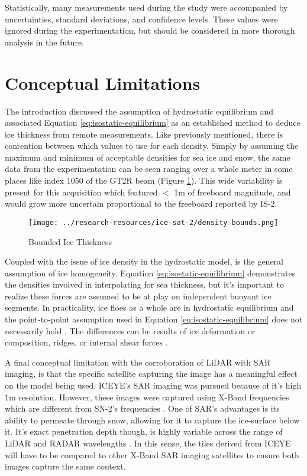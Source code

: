 Statistically, many measurements used during the study were accompanied by uncertainties, standard deviations, and confidence levels. These values were ignored during the experimentation, but should be considered in more thorough analysis in the future. 

\section{Conceptual Limitations}
The introduction discussed the assumption of hydrostatic equilibrium and associated Equation \ref{eq:isostatic-equilibrium} as an established method to deduce ice thickness from remote measurements. Like previously mentioned, there is contention between which values to use for each density. Simply by assuming the maximum and minimum of acceptable densities for sea ice and snow, the same data from the experimentation can be seen ranging over a whole meter in some places like index 1050 of the GT2R beam (Figure \ref{fig:density-bounds}). This wide variability is present for this acquisition which featured $<$ 1m of freeboard magnitude, and would grow more uncertain proportional to the freeboard reported by IS-2.

\begin{figure}[h]
	\centering
	\texttt{[image: ../research-resources/ice-sat-2/density-bounds.png]}
	\caption[Effect of Density Estimations on Ice Thickness Interpolation]{Bounded Ice Thickness}
	\label{fig:density-bounds}
\end{figure}

Coupled with the issue of ice density in the hydrostatic model, is the general assumption of ice homogeneity. Equation \ref{eq:isostatic-equilibrium} demonstrates the densities involved in interpolating for sea thickness, but it's important to realize these forces are assumed to be at play on independent buoyant ice segments. In practicality, ice floes as a whole are in hydrostatic equilibrium and the point-to-point assumption used in Equation \ref{eq:isostatic-equilibrium} does not necessarily hold \cite{Forsström_Gerland_Pedersen_2011}. The differences can be results of ice deformation or composition, ridges, or internal shear forces \cite{Hutchings_Heil_Lecomte_Stevens_Steer_Lieser_2015,sea-ice-properties}. 

A final conceptual limitation with the corroboration of LiDAR with SAR imaging, is that the specific satellite capturing the image has a meaningful effect on the model being used. ICEYE's SAR imaging was pursued because of it's high 1m resolution. However, these images were captured using X-Band frequencies which are different from SN-2's frequencies \cite{iceye-products,Sentinel-2-Availability}. One of SAR's advantages is its ability to permeate through snow, allowing for it to capture the ice-surface below it. It's exact penetration depth though, is highly variable across the range of LiDAR and RADAR wavelengths \cite{remotesensingkinematics}. In this sense, the tiles derived from ICEYE will have to be compared to other X-Band SAR imaging satellites to ensure both images capture the same context.



